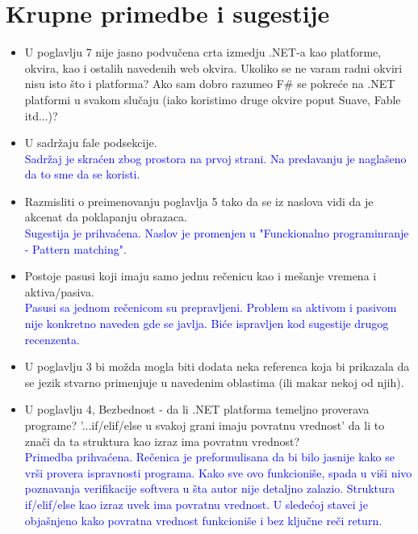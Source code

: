 \documentclass[a4paper]{report}
\newcommand{\odgovor}[1]{\textcolor{blue}{#1}}
\begin{document}
\section{Krupne primedbe i sugestije}
\begin{itemize}
    \item U poglavlju 7 nije jasno podvučena crta izmedju .NET-a kao platforme, okvira, kao i ostalih navedenih web okvira. Ukoliko se ne varam radni okviri nisu isto što i platforma? Ako sam dobro razumeo F\# se pokreće na .NET platformi u svakom slučaju (iako koristimo druge okvire poput Suave, Fable itd...)?
    \item U sadržaju fale podsekcije. \\ \odgovor{Sadržaj je skraćen zbog prostora na prvoj strani. Na predavanju je naglašeno da to sme da se koristi.}
    \item Razmisliti o preimenovanju poglavlja 5 tako da se iz naslova vidi da je akcenat da poklapanju obrazaca. \\ 
    \odgovor {Sugestija je prihvaćena. Naslov je promenjen u "Funckionalno programinranje - Pattern matching".}
    \item Postoje pasusi koji imaju samo jednu rečenicu kao i mešanje vremena i aktiva/pasiva. 
    \\ \odgovor{Pasusi sa jednom rečenicom su prepravljeni. Problem sa aktivom i pasivom nije konkretno naveden gde se javlja. Biće ispravljen kod sugestije drugog recenzenta.}
    \item U poglavlju 3 bi možda mogla biti dodata neka referenca koja bi prikazala da se jezik stvarno primenjuje u navedenim oblastima (ili makar nekoj od njih).
    \item U poglavlju 4, Bezbednost - da li .NET platforma temeljno proverava programe? '...if/elif/else u svakoj grani imaju povratnu vrednost' da li to znači da ta struktura kao izraz ima povratnu vrednost?
    \\ \odgovor{Primedba prihvaćena. Rečenica je preformulisana da bi bilo jasnije kako se vrši provera ispravnosti programa. Kako sve ovo funkcioniše, spada u viši nivo poznavanja verifikacije softvera u šta autor nije detaljno zalazio.
    Struktura if/elif/else kao izraz uvek ima povratnu vrednost. U sledećoj stavci je objašnjeno kako povratna vrednost funkcioniše i bez ključne reči return. }
    

\end{itemize}
\end{document}
